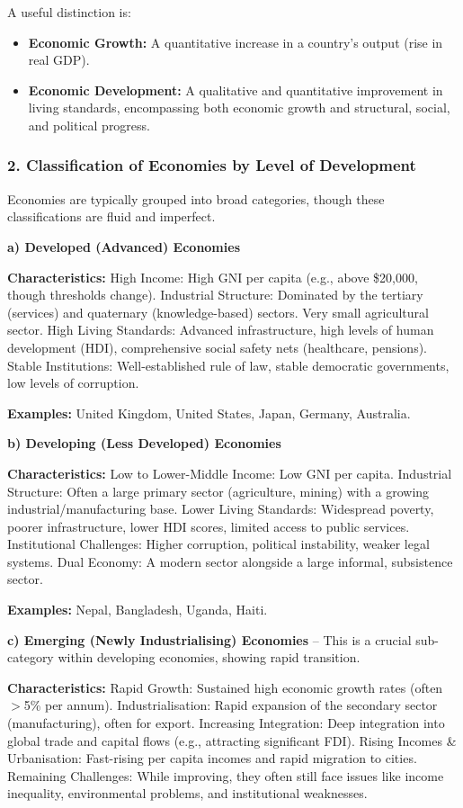 \documentclass[11pt, a4paper, twoside]{book}
\begin{document}
A useful distinction is:
\begin{itemize}
  \item \textbf{Economic Growth:} A quantitative increase in a country's output (rise in real GDP).
  \item \textbf{Economic Development:} A qualitative and quantitative improvement in living standards, encompassing both economic growth and structural, social, and political progress.
\end{itemize}

\subsubsection{2. Classification of Economies by Level of Development}

Economies are typically grouped into broad categories, though these classifications are fluid and imperfect.

\textbf{a) Developed (Advanced) Economies}

\textbf{Characteristics:} High Income: High GNI per capita (e.g., above \$20,000, though thresholds change). Industrial Structure: Dominated by the tertiary (services) and quaternary (knowledge-based) sectors. Very small agricultural sector. High Living Standards: Advanced infrastructure, high levels of human development (HDI), comprehensive social safety nets (healthcare, pensions). Stable Institutions: Well-established rule of law, stable democratic governments, low levels of corruption.

\textbf{Examples:} United Kingdom, United States, Japan, Germany, Australia.

\textbf{b) Developing (Less Developed) Economies}

\textbf{Characteristics:} Low to Lower-Middle Income: Low GNI per capita. Industrial Structure: Often a large primary sector (agriculture, mining) with a growing industrial/manufacturing base. Lower Living Standards: Widespread poverty, poorer infrastructure, lower HDI scores, limited access to public services. Institutional Challenges: Higher corruption, political instability, weaker legal systems. Dual Economy: A modern sector alongside a large informal, subsistence sector.

\textbf{Examples:} Nepal, Bangladesh, Uganda, Haiti.

\textbf{c) Emerging (Newly Industrialising) Economies} -- This is a crucial sub-category within developing economies, showing rapid transition.

\textbf{Characteristics:} Rapid Growth: Sustained high economic growth rates (often $>$5\% per annum). Industrialisation: Rapid expansion of the secondary sector (manufacturing), often for export. Increasing Integration: Deep integration into global trade and capital flows (e.g., attracting significant FDI). Rising Incomes \& Urbanisation: Fast-rising per capita incomes and rapid migration to cities. Remaining Challenges: While improving, they often still face issues like income inequality, environmental problems, and institutional weaknesses.
\end{document}

